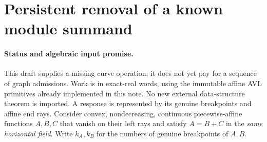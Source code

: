 \section[Known module summand removal]{Persistent removal of a known module summand}
\label{sec:op3-module-curve-removal}

\paragraph{Status and algebraic input promise.}
This \statusproved{} draft supplies a missing curve operation; it does not
yet pay for a sequence of graph admissions. Work is in exact-real words,
using the immutable affine AVL primitives already implemented in this note.
No new external data-structure theorem is imported. A response is represented
by its genuine breakpoints and affine end rays. Consider convex,
nondecreasing, continuous piecewise-affine functions $A,B,C$ that vanish
on their left rays and satisfy $A=B+C$ in the \emph{same horizontal field}.
Write $k_A,k_B$ for the numbers of genuine breakpoints of $A,B$.


